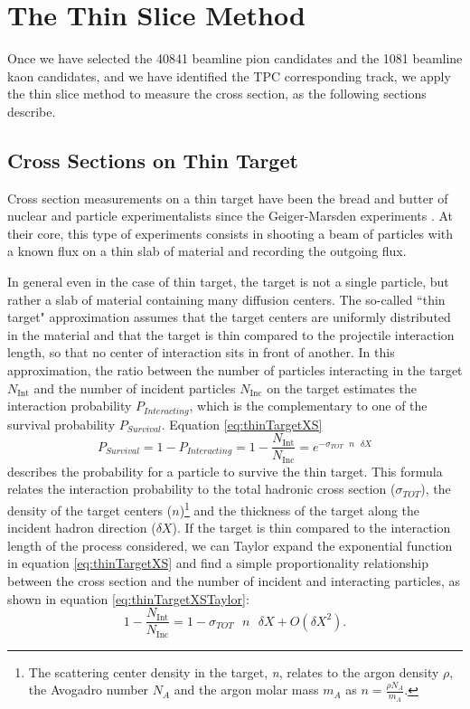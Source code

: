 \section{The Thin Slice Method}\label{ch:ThinSliceMethod}



Once we have selected the 40841 beamline pion candidates  and the 1081 beamline kaon candidates, and we have identified the TPC corresponding track, we apply the thin slice method to measure the cross section, as the following sections describe. 
\subsection{Cross Sections on Thin Target}
Cross section measurements on a thin target have been the bread and butter of nuclear and particle experimentalists since the Geiger-Marsden experiments \cite{Geiger1909}. At their core, this type of experiments consists in shooting a beam of particles with a known flux on a thin slab of material and recording the outgoing flux. 


In general even in the case of thin target, the target is not a single particle, but rather a slab of material containing many diffusion centers. The so-called  ``thin target" approximation assumes that the target centers are uniformly distributed in the material and that the target is thin compared to the projectile interaction length, so that no center of interaction sits in front of another. In this approximation, the ratio between the number of particles interacting in the target $N_{\text{Int}}$ and the number of incident particles $N_{\text{Inc}}$ on the target estimates the interaction probability $P_{Interacting}$, which is the complementary to one of the survival probability $P_{Survival}$. 
Equation \ref{eq:thinTargetXS} 
\begin{equation}
P_{Survival} = 1- P_{Interacting} = 1 - \frac{N_{\text{Int}}}{N_{\text{Inc}}} = e^{-\sigma_{TOT}\text{ } n \text{ }\delta X}
\label{eq:thinTargetXS}
\end{equation}
describes the probability for a particle to survive the thin target. This formula relates  the interaction probability to the total hadronic cross section ($\sigma_{TOT}$), the density of the target centers ($n$)\footnote{The scattering center density in the target, {\emph{n}},  relates to the argon density $\rho$, the Avogadro number  $ N_{A} $ and the argon molar mass $m_A$ as $n=\frac{\rho N_{A} }{m_A}$.}    and  the thickness of the target  along the incident hadron direction ($\delta X$). If the target is thin compared to the interaction length of the process considered, we can Taylor expand the exponential function in equation \ref{eq:thinTargetXS} and find a simple proportionality relationship between the cross section and the number of incident and interacting particles, as shown in equation \ref{eq:thinTargetXSTaylor}:
\begin{equation}
1 - \frac{N_{\text{Int}}}{N_{\text{Inc}}} =  1 -\sigma_{TOT} \text{  }n \text{  }\delta X + O(\delta X^2).
\label{eq:thinTargetXSTaylor}
\end{equation}

